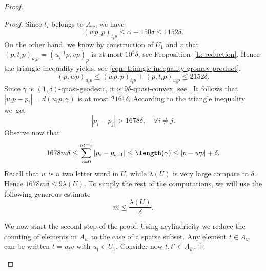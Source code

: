 \begin{proof}
\begin{proof}
Since $t_i$ belongs to $A_w$, we have
\begin{equation*}
(wp,p)_{t_ip} \leq \alpha + 150\delta \leq 1152\delta.
\end{equation*}
On the other hand, we know by construction of $U_1$ and $v$ that $(p,t_ip)_{u_ip} = (u_i^{-1}p,vp)_p$ is at most $10^3\delta$, see Proposition~\ref{L: reduction}.
Hence the triangle inequality yields, see \eqref{eqn: triangle inequality gromov product},
\begin{equation*}
(p,wp)_{u_ip} \leq (wp,p)_{t_ip} + (p,t_ip)_{u_ip} \leq 2152\delta.
\end{equation*}
Since $\gamma$ is $(1, \delta)$-quasi-geodesic, it is $9\delta$-quasi-convex, see \cite[Cor.\,2.7(2)]{coulon_geometry_2014}.
It follows that $|u_ip - p_i| = d(u_ip,\gamma)$ is at most $2161\delta$.
According to the triangle inequality we~get
\begin{equation*}
|p_i - p_j| > 1678\delta,\quad \forall i \neq j.
\end{equation*}
Observe now that
\begin{equation*}
1678m\delta \leq \sum_{i = 0}^{m-1} |p_i - p_{i+1}|
\leq \length(\gamma) \leq |p - wp| + \delta.
\end{equation*}
Recall that $w$ is a two letter word in $U$, while $\lambda(U)$ is very large compare to $\delta$.
Hence $1678m\delta \leq 9\lambda(U)$.
To simply the rest of the computations, we will use the following generous estimate
\begin{equation*}
m \leq \frac{ \lambda(U)}\delta.
\end{equation*}

We now start the second step of the proof.
Using acylindricity we reduce the counting of elements in $A_w$ to the case of a sparse subset.
Any element $t \in A_w$ can be written $t = u_tv$ with $u_t \in U_1$.
Consider now $t,t' \in A_w$.


\end{proof}
\end{proof}
